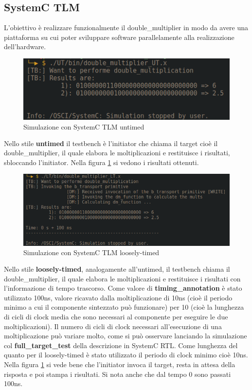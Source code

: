 \documentclass[]{IEEEtran}
\begin{document}
\subsection{SystemC TLM}
L'obiettivo è realizzare funzionalmente il double\_multiplier in modo da avere una piattaforma su cui poter sviluppare software parallelamente alla realizzazione dell'hardware.

\begin{figure}[!htb]
    \centering
    \includegraphics[width=\linewidth]{figures/SIM_TLM_UT.png}
    \caption{Simulazione con SystemC TLM untimed}
    \label{fig:SIM_TLM_UT}
\end{figure}
Nello stile \textbf{untimed} il testbench è l'initiator che chiama il target cioè il double\_multiplier, il quale elabora le moltiplicazioni e restituisce i risultati, sbloccando l'initiator. Nella figura \ref{fig:SIM_TLM_UT} si vedono i risultati ottenuti.

\begin{figure}[!htb]
    \centering
    \includegraphics[width=\linewidth]{figures/SIM_TLM_LT.png}
    \caption{Simulazione con SystemC TLM loosely-timed}
    \label{fig:SIM_TLM_LT}
\end{figure}
Nello stile \textbf{loosely-timed}, analogamente all'untimed, il testbench chiama il double\_multiplier, il quale elabora le moltiplicazioni e restituisce i risultati con l'informazione di tempo trascorso. Come valore di \textbf{timing\_annotation} è stato utilizzato 100ns, valore ricavato dalla moltiplicazione di 10ns (cioè il periodo minimo a cui il componente sintezzato può funzionare) per 10 (cioè la lunghezza di cicli di clock media che sono necessari al componente per eseguire le due moltiplicazioni). Il numero di cicli di clock necessari all'esecuzione di una moltiplicazione può variare molto, come si può osservare lanciando la simulazione col \textbf{full\_target\_test} della descrizione in SystemC RTL. Come lunghezza del quanto per il loosely-timed è stato utilizzato il periodo di clock minimo cioè 10ns. Nella figura \ref{fig:SIM_TLM_UT} si vede bene che l'initiator invoca il target, resta in attesa della risposta e poi stampa i risultati. Si nota anche che dal tempo 0 sono passati 100ns.
\end{document}
